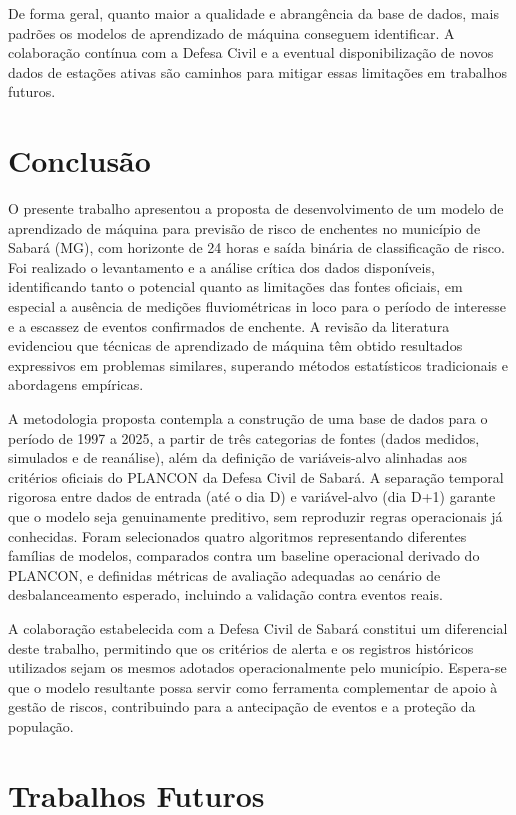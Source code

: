 \documentclass[12pt]{article}
\begin{document}
De forma geral, quanto maior a qualidade e abrangência da base de dados, mais padrões os modelos de aprendizado de máquina conseguem identificar. A colaboração contínua com a Defesa Civil e a eventual disponibilização de novos dados de estações ativas são caminhos para mitigar essas limitações em trabalhos futuros.

\section{Conclusão}

O presente trabalho apresentou a proposta de desenvolvimento de um modelo de aprendizado de máquina para previsão de risco de enchentes no município de Sabará (MG), com horizonte de 24 horas e saída binária de classificação de risco. Foi realizado o levantamento e a análise crítica dos dados disponíveis, identificando tanto o potencial quanto as limitações das fontes oficiais, em especial a ausência de medições fluviométricas in loco para o período de interesse e a escassez de eventos confirmados de enchente. A revisão da literatura evidenciou que técnicas de aprendizado de máquina têm obtido resultados expressivos em problemas similares, superando métodos estatísticos tradicionais e abordagens empíricas.

A metodologia proposta contempla a construção de uma base de dados para o período de 1997 a 2025, a partir de três categorias de fontes (dados medidos, simulados e de reanálise), além da definição de variáveis-alvo alinhadas aos critérios oficiais do PLANCON da Defesa Civil de Sabará. A separação temporal rigorosa entre dados de entrada (até o dia D) e variável-alvo (dia D+1) garante que o modelo seja genuinamente preditivo, sem reproduzir regras operacionais já conhecidas. Foram selecionados quatro algoritmos representando diferentes famílias de modelos, comparados contra um baseline operacional derivado do PLANCON, e definidas métricas de avaliação adequadas ao cenário de desbalanceamento esperado, incluindo a validação contra eventos reais.

A colaboração estabelecida com a Defesa Civil de Sabará constitui um diferencial deste trabalho, permitindo que os critérios de alerta e os registros históricos utilizados sejam os mesmos adotados operacionalmente pelo município. Espera-se que o modelo resultante possa servir como ferramenta complementar de apoio à gestão de riscos, contribuindo para a antecipação de eventos e a proteção da população.

\section{Trabalhos Futuros}
\end{document}
